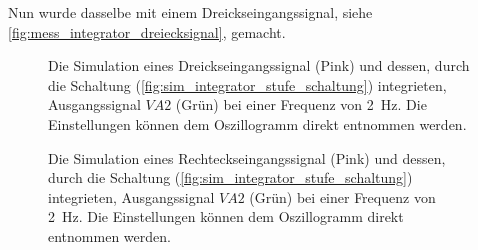 \documentclass[12pt,english,ngerman]{scrartcl}
\begin{document}
Nun wurde dasselbe mit einem Dreickseingangssignal, siehe
\autoref{fig:mess_integrator_dreiecksignal}, gemacht.

\begin{figure}[H]
  \centering
    \caption{Die Simulation eines Dreickseingangssignal (Pink) und dessen,
    durch die Schaltung (\autoref{fig:sim_integrator_stufe_schaltung})
    integrieten, Ausgangssignal $VA2$ (Grün) bei einer Frequenz von
    \SI{2}{\hertz}. Die Einstellungen können dem Oszillogramm direkt entnommen
    werden.}
  \label{fig:sim_int_stufe_tri}
\end{figure}

\begin{figure}[H]
  \centering
  \caption{Die Simulation eines Rechteckseingangssignal (Pink) und dessen,
  durch die Schaltung (\autoref{fig:sim_integrator_stufe_schaltung})
  integrieten, Ausgangssignal $VA2$ (Grün) bei einer Frequenz von \SI{2}{\hertz}.
  Die Einstellungen können dem Oszillogramm direkt entnommen werden.}
  \label{fig:sim_int_stufe_rect}
\end{figure}



\end{document}

